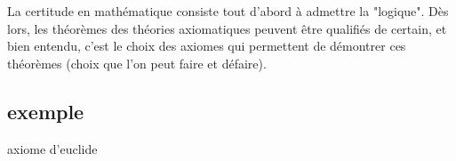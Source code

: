 La certitude en mathématique consiste tout d'abord à admettre la "logique". Dès lors, les théorèmes des théories axiomatiques peuvent être qualifiés de certain, et bien entendu, c'est le choix des axiomes qui permettent de démontrer ces théorèmes (choix que l'on peut faire et défaire).

\subsection{exemple}

axiome d'euclide

